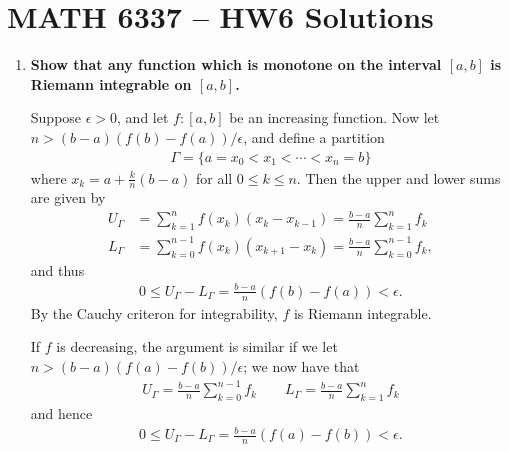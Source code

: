 \documentclass[a4paper,12pt]{article}
\begin{document}
\section*{MATH 6337 -- HW6 Solutions}
\begin{enumerate}
    \item
        \boldmath\textbf{Show that any function which is monotone on the interval $[a, b]$ is Riemann integrable on $[a, b]$.
        }\unboldmath \par
        Suppose $\epsilon > 0$, and let $f : [a, b]$ be an increasing function. Now let $n > (b - a)(f(b) - f(a))/\epsilon$, and define a partition
        \begin{align*}
            \Gamma = \{ a = x_0 < x_1 < \cdots < x_n = b \}
        \end{align*}
        where $x_k = a + \frac{k}{n}(b - a)$ for all $0 \leq k \leq n$. Then the upper and lower sums are given by
        \begin{align*}
            U_\Gamma &= \sum_{k = 1}^n f(x_k) (x_k - x_{k - 1}) = \frac{b - a}{n} \sum_{k = 1}^n f_k \\
            L_\Gamma &= \sum_{k = 0}^{n - 1} f(x_k) (x_{k + 1} - x_k) = \frac{b - a}{n} \sum_{k = 0}^{n - 1} f_k,
        \end{align*}
        and thus
        \begin{align*}
            0 \leq U_\Gamma - L_\Gamma = \frac{b - a}{n} (f(b) - f(a)) < \epsilon.
        \end{align*}
        By the Cauchy criteron for integrability, $f$ is Riemann integrable. \par
        If $f$ is decreasing, the argument is similar if we let $n > (b - a)(f(a) - f(b))/\epsilon$; we now have that
        \begin{align*}
            U_\Gamma = \frac{b - a}{n} \sum_{k = 0}^{n - 1} f_k \qquad
            L_\Gamma = \frac{b - a}{n} \sum_{k = 1}^n f_k
        \end{align*}
        and hence
        \begin{align*}
            0 \leq U_\Gamma - L_\Gamma = \frac{b - a}{n} (f(a) - f(b)) < \epsilon.
        \end{align*}


\end{enumerate}
\end{document}
